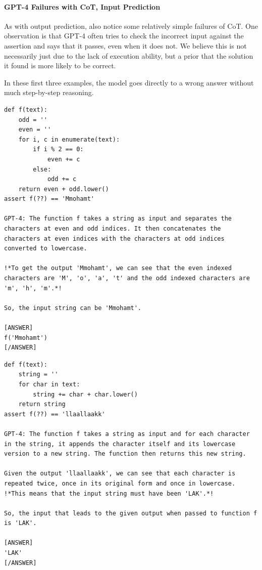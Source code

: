 \paragraph{GPT-4 Failures with CoT, Input Prediction}
As with output prediction, also notice some relatively simple failures of CoT. One observation is that GPT-4 often tries to check the incorrect input against the assertion and says that it passes, even when it does not. We believe this is not necessarily just due to the lack of execution ability, but a prior that the solution it found is more likely to be correct.

In these first three examples, the model goes directly to a wrong answer without much step-by-step reasoning.

\begin{lstlisting}
def f(text):
    odd = ''
    even = ''
    for i, c in enumerate(text):
        if i % 2 == 0:
            even += c
        else:
            odd += c
    return even + odd.lower()
assert f(??) == 'Mmohamt'

GPT-4: The function f takes a string as input and separates the characters at even and odd indices. It then concatenates the characters at even indices with the characters at odd indices converted to lowercase. 

!*To get the output 'Mmohamt', we can see that the even indexed characters are 'M', 'o', 'a', 't' and the odd indexed characters are 'm', 'h', 'm'.*!

So, the input string can be 'Mmohamt'. 

[ANSWER]
f('Mmohamt')
[/ANSWER]
\end{lstlisting}

\begin{lstlisting}
def f(text):
    string = ''
    for char in text:
        string += char + char.lower()
    return string
assert f(??) == 'llaallaakk'

GPT-4: The function f takes a string as input and for each character in the string, it appends the character itself and its lowercase version to a new string. The function then returns this new string.

Given the output 'llaallaakk', we can see that each character is repeated twice, once in its original form and once in lowercase. !*This means that the input string must have been 'LAK'.*!

So, the input that leads to the given output when passed to function f is 'LAK'.

[ANSWER]
'LAK'
[/ANSWER]
\end{lstlisting}

